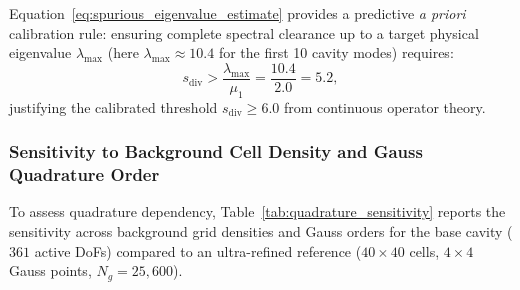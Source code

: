 \documentclass[preprint,12pt]{elsarticle}
\begin{document}
Equation~\eqref{eq:spurious_eigenvalue_estimate} provides a predictive \emph{a priori} calibration rule: ensuring complete spectral clearance up to a target physical eigenvalue $\lambda_{\max}$ (here $\lambda_{\max} \approx 10.4$ for the first 10 cavity modes) requires:
\begin{equation}
    s_{\mathrm{div}} > \frac{\lambda_{\max}}{\mu_1} = \frac{10.4}{2.0} = 5.2,
    \label{eq:a_priori_s_div_rule}
\end{equation}
justifying the calibrated threshold $s_{\mathrm{div}} \ge 6.0$ from continuous operator theory.

\subsubsection{Sensitivity to Background Cell Density and Gauss Quadrature Order}
\label{subsubsec:quadrature_sensitivity}

To assess quadrature dependency, Table~\ref{tab:quadrature_sensitivity} reports the sensitivity across background grid densities and Gauss orders for the base cavity ($361$ active DoFs) compared to an ultra-refined reference ($40 \times 40$ cells, $4 \times 4$ Gauss points, $N_g = 25{,}600$).
\end{document}
